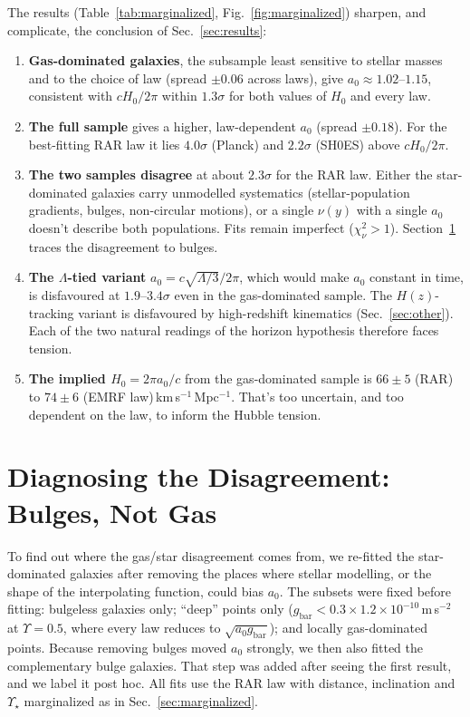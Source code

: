 \documentclass[11pt,a4paper]{article}
\begin{document}
The results (Table~\ref{tab:marginalized}, Fig.~\ref{fig:marginalized}) sharpen, and complicate, the conclusion of Sec.~\ref{sec:results}:
\begin{enumerate}
\item \textbf{Gas-dominated galaxies}, the subsample least sensitive to stellar masses and to the choice of law (spread $\pm0.06$ across laws), give $a_0 \approx 1.02$--$1.15$, consistent with $cH_0/2\pi$ within $1.3\sigma$ for both values of $H_0$ and every law.
\item \textbf{The full sample} gives a higher, law-dependent $a_0$ (spread $\pm0.18$). For the best-fitting RAR law it lies $4.0\sigma$ (Planck) and $2.2\sigma$ (SH0ES) above $cH_0/2\pi$.
\item \textbf{The two samples disagree} at about $2.3\sigma$ for the RAR law. Either the star-dominated galaxies carry unmodelled systematics (stellar-population gradients, bulges, non-circular motions), or a single $\nu(y)$ with a single $a_0$ doesn't describe both populations. Fits remain imperfect ($\chi^2_\nu > 1$). Section~\ref{sec:diagnostics} traces the disagreement to bulges.
\item \textbf{The $\Lambda$-tied variant} $a_0 = c\sqrt{\Lambda/3}/2\pi$, which would make $a_0$ constant in time, is disfavoured at $1.9$--$3.4\sigma$ even in the gas-dominated sample. The $H(z)$-tracking variant is disfavoured by high-redshift kinematics (Sec.~\ref{sec:other}). Each of the two natural readings of the horizon hypothesis therefore faces tension.
\item \textbf{The implied $H_0 = 2\pi a_0/c$} from the gas-dominated sample is $66 \pm 5$ (RAR) to $74 \pm 6$ (EMRF law)\,km\,s$^{-1}$\,Mpc$^{-1}$. That's too uncertain, and too dependent on the law, to inform the Hubble tension.
\end{enumerate}

\section{Diagnosing the Disagreement: Bulges, Not Gas}
\label{sec:diagnostics}
To find out where the gas/star disagreement comes from, we re-fitted the star-dominated galaxies after removing the places where stellar modelling, or the shape of the interpolating function, could bias $a_0$. The subsets were fixed before fitting: bulgeless galaxies only; ``deep'' points only ($g_{\mathrm{bar}} < 0.3\times1.2\times10^{-10}$\,m\,s$^{-2}$ at $\Upsilon = 0.5$, where every law reduces to $\sqrt{a_0 g_{\mathrm{bar}}}$); and locally gas-dominated points. Because removing bulges moved $a_0$ strongly, we then also fitted the complementary bulge galaxies. That step was added after seeing the first result, and we label it post hoc. All fits use the RAR law with distance, inclination and $\Upsilon_\star$ marginalized as in Sec.~\ref{sec:marginalized}.
\end{document}
